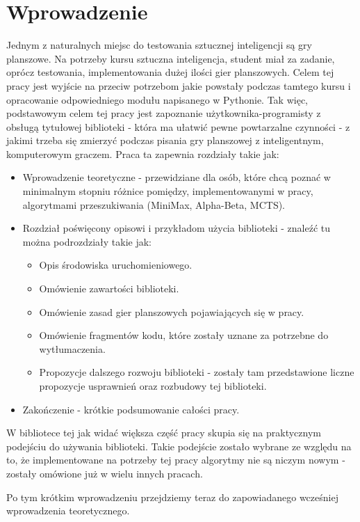 \documentclass[polish,shortabstract,inz]{iithesis}
\author{Mikołaj Kowalik}
\begin{document}

\chapter{Wprowadzenie}
Jednym z naturalnych miejsc do testowania sztucznej inteligencji są gry planszowe.
Na potrzeby kursu sztuczna inteligencja, student miał za zadanie, oprócz testowania, implementowania dużej ilości gier planszowych.
Celem tej pracy jest wyjście na przeciw potrzebom jakie powstały podczas tamtego kursu i opracowanie odpowiedniego modułu napisanego w Pythonie.
Tak więc, podstawowym celem tej pracy jest zapoznanie użytkownika-programisty z obsługą tytułowej biblioteki - która ma ułatwić pewne powtarzalne czynności - z jakimi trzeba się zmierzyć podczas pisania gry planszowej z inteligentnym, komputerowym graczem.
Praca ta zapewnia rozdziały takie jak:
\begin{itemize}
  \item Wprowadzenie teoretyczne - przewidziane dla osób, które chcą poznać w minimalnym stopniu różnice pomiędzy, implementowanymi w pracy, algorytmami przeszukiwania (MiniMax, Alpha-Beta, MCTS).
  \item Rozdział poświęcony opisowi i przykładom użycia biblioteki - znaleźć tu można podrozdziały takie jak:
    \begin{itemize}
      \item Opis środowiska uruchomieniowego.
      \item Omówienie zawartości biblioteki.
      \item Omówienie zasad gier planszowych pojawiających się w pracy.
      \item Omówienie fragmentów kodu, które zostały uznane za potrzebne do wytłumaczenia.
      \item Propozycje dalszego rozwoju biblioteki - zostały tam przedstawione liczne propozycje usprawnień oraz rozbudowy tej biblioteki.
    \end{itemize}
  \item Zakończenie - krótkie podsumowanie całości pracy.
\end{itemize}

W bibliotece tej jak widać większa część pracy skupia się na praktycznym podejściu do używania biblioteki.
Takie podejście zostało wybrane ze względu na to, że implementowane na potrzeby tej pracy algorytmy nie są niczym nowym - zostały omówione już w wielu innych pracach.

Po tym krótkim wprowadzeniu przejdziemy teraz do zapowiadanego wcześniej wprowadzenia teoretycznego.
\end{document}
